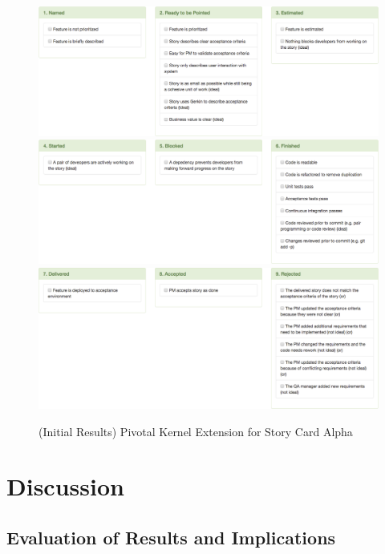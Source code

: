 \documentclass[preprint,12pt,3p]{elsarticle}
\begin{document}
{\begin{figure}[ht]
\includegraphics[width=6.25in]{pivotal_images/story_card1}
\includegraphics[width=6.25in]{pivotal_images/story_card2}
\includegraphics[width=6.25in]{pivotal_images/story_card3}
\caption{(Initial Results) Pivotal Kernel Extension for Story Card Alpha}
\label{KernelExtension}
\end{figure}

\section{Discussion}
\label{Discussion}

\subsection{Evaluation of Results and Implications}

}
\end{document}
